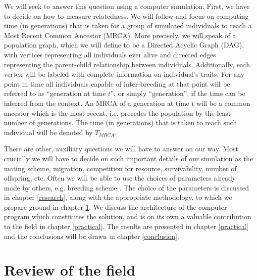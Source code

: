 \documentclass{l4proj}
\newif\ifdebug
\begin{document}
We will seek to answer this question using a computer simulation. First, we have to decide on how to measure relatedness. We will follow \cite{rohde04} and focus on computing time (in generations) that is taken for a group of simulated individuals to reach a Most Recent Common Ancestor (MRCA). More precisely, we will speak of a \gls{population graph}, which we will define to be a Directed Acyclic Graph (DAG), with vertices representing all individuals ever alive and directed edges representing the parent-child relationship between individuals. Additionally, each vertex will be labeled with complete information on individual's traits. For any point in time all individuals capable of inter-breeding at that point will be referred to as ``generation at time $t$'', or simply ``generation'', if the time can be inferred from the context. An MRCA of a generation at time $t$ will be a common ancestor which is the most recent, i.e. precedes the population by the least number of generations. The time (in generations) that is taken to reach such individual will be denoted by $T_{MRCA}$.

There are other, auxiliary questions we will have to answer on our way. Most crucially we will have to decide on such important details of our simulation as the mating scheme, migration, competition for resource, survivability, number of offspring, etc. Often we will be able to use the choices of parameters already made by others, e.g. breeding scheme \parencite{peng10}. The choice of the parameters is discussed in chapter \ref{research}, along with the appropriate methodology, to which we prepare ground in chapter \ref{review}. We discuss the architecture of the computer program which constitutes the solution, and is on its own a valuable contribution to the field in chapter \ref{practical}. The results are presented in chapter \ref{practical} and the conclusions will be drawn in chapter \ref{conclusion}.

\chapter{Review of the field}\label{review}

\ifdebug
  This should be a critical survey of the relevant literature, adhering to normal academic conventions in citing references, etc. Here I need to discuss coalescent method vs. forward-in time method vs. sample-based methods.

explain trait, explain mendelian genetics, explain homozygous, heterozygous, dominant, sweep, polymorphism example of polymorphism: impression of bitterness while eating brussel sprouts, linkage equilibrium, panmictic population, allele, epigenetics, probability density function.
\fi
\end{document}
